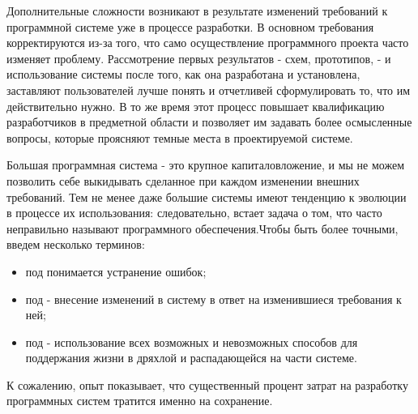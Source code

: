 \documentclass[11pt]{article}
\begin{document}
Дополнительные сложности возникают в результате изменений требований к программной системе уже в процессе разработки. В основном требования корректируются из-за того, что само осуществление программного проекта часто изменяет проблему. Рассмотрение первых результатов - схем, прототипов, - и использование системы после того, как она разработана и установлена, заставляют пользователей лучше понять и отчетливей сформулировать то, что им действительно нужно. В то же время этот процесс повышает квалификацию разработчиков в предметной области и позволяет им задавать более осмысленные вопросы, которые проясняют темные места в проектируемой системе. \bigskip

Большая программная система - это крупное капиталовложение, и мы не можем позволить себе выкидывать сделанное при каждом изменении внешних требований. Тем не менее даже большие системы имеют тенденцию к эволюции в процессе их использования: следовательно, встает задача о том, что часто неправильно называют  программного обеспечения.\rm Чтобы быть более точными, введем несколько терминов: 
\begin{itemize}
\item под \rm понимается устранение ошибок;
\item под \rm - внесение изменений в систему в ответ на изменившиеся требования к ней;
\item под \rm - использование всех возможных и невозможных способов для поддержания жизни в дряхлой и распадающейся на части системе.
\end{itemize}
К сожалению, опыт показывает, что существенный процент затрат на разработку программных систем тратится именно на сохранение. \bigskip
\end{document}

